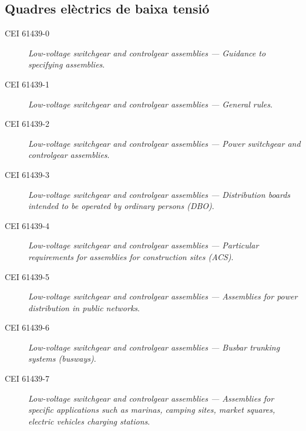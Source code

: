 \subsection*{Quadres elèctrics de baixa tensió}
\begin{description}
    \item [\hspace{5mm}CEI 61439-0] \textit{Low-voltage switchgear and controlgear assemblies --- Guidance to specifying assemblies}.
    \item [\hspace{5mm}CEI 61439-1] \textit{Low-voltage switchgear and controlgear assemblies --- General rules}.
    \item [\hspace{5mm}CEI 61439-2] \textit{Low-voltage switchgear and controlgear assemblies --- Power switchgear and controlgear assemblies}.
    \item [\hspace{5mm}CEI 61439-3] \textit{Low-voltage switchgear and controlgear assemblies --- Distribution boards intended to be operated by ordinary persons (DBO)}.
    \item [\hspace{5mm}CEI 61439-4] \textit{Low-voltage switchgear and controlgear assemblies --- Particular requirements for assemblies for construction sites (ACS)}.
    \item [\hspace{5mm}CEI 61439-5] \textit{Low-voltage switchgear and controlgear assemblies --- Assemblies for power distribution in public networks}.
    \item [\hspace{5mm}CEI 61439-6] \textit{Low-voltage switchgear and controlgear assemblies --- Busbar trunking systems (bus\-ways)}.
    \item [\hspace{5mm}CEI 61439-7] \textit{Low-voltage switchgear and controlgear assemblies --- Assemblies for specific applications such as marinas, camping sites, market squares, electric vehicles charging stations}.
\end{description}

